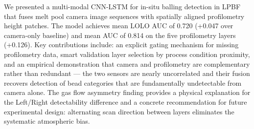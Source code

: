 \documentclass[12pt, letterpaper]{article}
\begin{document}
We presented a multi-modal CNN-LSTM for in-situ balling
detection in LPBF that fuses melt pool camera image sequences
with spatially aligned profilometry height patches. The model
achieves mean LOLO AUC of 0.720 (+0.047 over camera-only
baseline) and mean AUC of 0.814 on the five profilometry
layers (+0.126). Key contributions include: an explicit
gating mechanism for missing profilometry data, smart
validation layer selection by process condition proximity,
and an empirical demonstration that camera and profilometry
are complementary rather than redundant — the two sensors
are nearly uncorrelated and their fusion recovers detection
of bead categories that are fundamentally undetectable
from camera alone. The gas flow asymmetry finding provides
a physical explanation for the Left/Right detectability
difference and a concrete recommendation for future
experimental design: alternating scan direction between
layers eliminates the systematic atmospheric bias.
\end{document}
